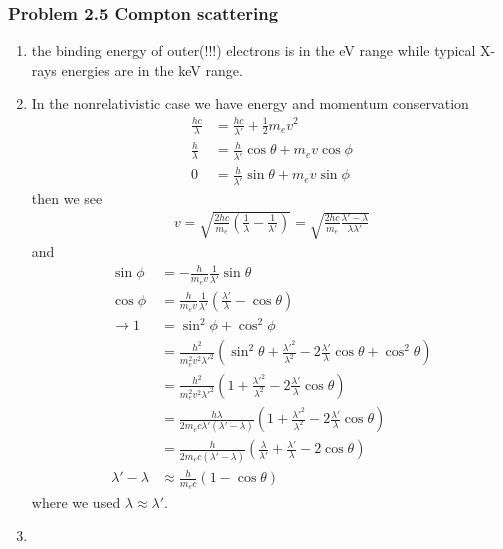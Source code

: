 \documentclass[10pt,a4paper]{book}
\theoremstyle{definition}
\begin{document}
\subsubsection{Problem 2.5 Compton scattering}
\begin{enumerate}
    \item the binding energy of outer(!!!) electrons is in the eV range while typical X-rays energies are in the keV range.
    \item In the nonrelativistic case we have energy and momentum conservation
    \begin{align}
        \frac{hc}{\lambda}&=\frac{hc}{\lambda'}+\frac{1}{2}m_ev^2\\
        \frac{h}{\lambda}&=\frac{h}{\lambda'}\cos\theta+m_ev\cos\phi\\
        0&=\frac{h}{\lambda'}\sin\theta+m_ev\sin\phi
    \end{align}
    then we see
    \begin{align}
        v=\sqrt{\frac{2hc}{m_e}\left(\frac{1}{\lambda}-\frac{1}{\lambda'}\right)}
        =\sqrt{\frac{2hc}{m_e}\frac{\lambda'-\lambda}{\lambda\lambda'}}
    \end{align}
    and
    \begin{align}
        \sin\phi&=-\frac{h}{m_ev}\frac{1}{\lambda'}\sin\theta\\
        \cos\phi&=\frac{h}{m_ev}\frac{1}{\lambda'}\left(\frac{\lambda'}{\lambda}-\cos\theta\right)\\
        \rightarrow1&=\sin^2\phi+\cos^2\phi\\
        &=\frac{h^2}{m_e^2v^2\lambda'^2}\left(\sin^2\theta+\frac{\lambda'^2}{\lambda^2}-2\frac{\lambda'}{\lambda}\cos\theta+\cos^2\theta\right)\\
        &=\frac{h^2}{m_e^2v^2\lambda'^2}\left(1+\frac{\lambda'^2}{\lambda^2}-2\frac{\lambda'}{\lambda}\cos\theta\right)\\
        &=\frac{h\lambda}{2m_ec\lambda'(\lambda'-\lambda)}\left(1+\frac{\lambda'^2}{\lambda^2}-2\frac{\lambda'}{\lambda}\cos\theta\right)\\
        &=\frac{h}{2m_ec(\lambda'-\lambda)}\left(\frac{\lambda}{\lambda'}+\frac{\lambda'}{\lambda}-2\cos\theta\right)\\
        \lambda'-\lambda&\approx\frac{h}{m_ec}\left(1-\cos\theta\right)
    \end{align}
    where we used $\lambda\approx\lambda'$.
    \item 
\end{enumerate}
    
\end{document}
